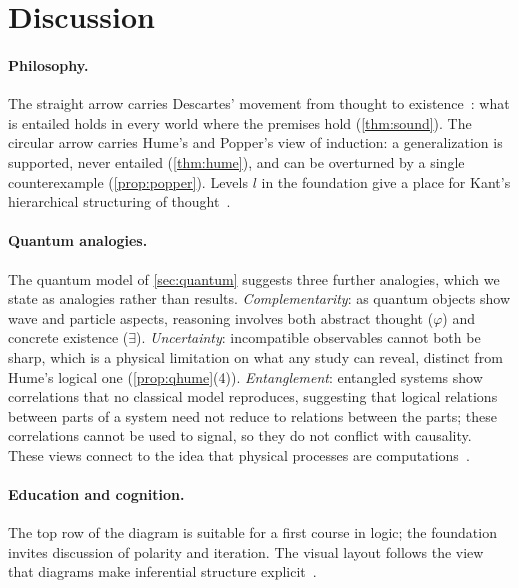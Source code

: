 \section{Discussion}\label{sec:discussion}

\paragraph{Philosophy.} The straight arrow carries Descartes' movement from thought to
existence~\cite{descartes}: what is entailed holds in every world where the premises hold
(\cref{thm:sound}). The circular arrow carries Hume's and Popper's view of induction: a
generalization is supported, never entailed (\cref{thm:hume}), and can be overturned by a single
counterexample (\cref{prop:popper}). Levels $l$ in the foundation give a place for Kant's
hierarchical structuring of thought~\cite{kant}.

\paragraph{Quantum analogies.} The quantum model of \cref{sec:quantum} suggests three further
analogies, which we state as analogies rather than results.
\emph{Complementarity}: as quantum objects show wave and particle aspects, reasoning involves both
abstract thought ($\varphi$) and concrete existence ($\exists$).
\emph{Uncertainty}: incompatible observables cannot both be sharp, which is a physical limitation on
what any study can reveal, distinct from Hume's logical one (\cref{prop:qhume}(4)).
\emph{Entanglement}: entangled systems show correlations that no classical model reproduces,
suggesting that logical relations between parts of a system need not reduce to relations between
the parts; these correlations cannot be used to signal, so they do not conflict with causality.
These views connect to the idea that physical processes are computations~\cite{deutsch,lloyd}.

\paragraph{Education and cognition.} The top row of the diagram is suitable for a first course in
logic; the foundation invites discussion of polarity and iteration. The visual layout follows
the view that diagrams make inferential structure explicit~\cite{larkin,johnsonlaird}.

